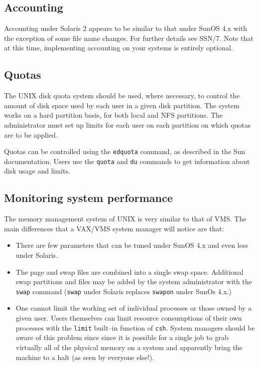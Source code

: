\subsection{Accounting}

Accounting under Solaris 2 appears to be similar to that under SunOS 4.x
with the exception of some file name changes.
For further details see SSN/7. Note that at this time, implementing
accounting on your systems is entirely optional.

\subsection{Quotas}

The UNIX disk quota system should be used, where necessary, to control the
amount of disk space used by each user in a given disk partition. The system
works on a hard partition basis, for both local and NFS partitions. The
administrator must set up limits for each user on each partition on which
quotas are to be applied.

Quotas can be controlled using the {\tt edquota} command, as described in the
Sun documentation. Users use the {\tt quota} and {\tt du} commands to get
information about disk usage and limits.

\subsection{Monitoring system performance}

The memory management system of UNIX is very similar to that of VMS. The main
differences that a VAX/VMS system manager will notice are that:

\begin{itemize}

\item There are few parameters that can be tuned under SunOS 4.x
and even less under Solaris.

\item The page and swap files are combined into a single swap space. Additional
swap partitions and files may be added by the system administrator with the
{\tt swap} command ({\tt swap} under Solaris replaces {\tt swapon} under
SunOs 4.x.)

\item One cannot limit the working set of individual processes or those owned
by a given user. Users themselves can limit resource consumptions of their
own processes with the {\tt limit} built--in function of {\tt csh}. System
managers should be aware of this problem since since it is possible for
a single job to grab virtually all of the physical memory on a system and
apparently bring the machine to a halt (as seen by everyone else!).

\end {itemize}


